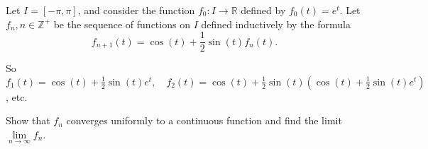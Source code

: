 \documentclass[../hw5]{subfiles}
\begin{document}
Let $I=[-\pi,\pi]$, and consider the function $f_0:I\to \mathbb{R}$ defined by $f_0(t)=e^t$. Let $f_n,n\in\mathbb{Z}^+$ be the sequence of functions on $I$ defined inductively by the formula
\[f_{n+1}(t)=\cos{(t)}+\frac{1}{2}\sin{(t)}f_n(t).\]

So $f_1(t)=\cos{(t)}+\frac{1}{2}\sin{(t)}e^t,\quad f_2(t)=\cos{(t)}+\frac{1}{2}\sin{(t)}\left( \cos{(t)}+\frac{1}{2}\sin{(t)}e^t \right)$, etc.

Show that $f_n$ converges uniformly to a continuous function and find the limit $\lim\limits_{n\to\infty}f_n$.
\end{document}
